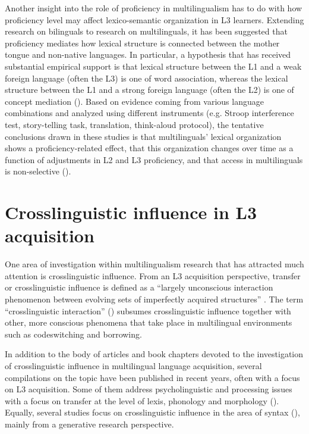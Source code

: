 \documentclass[output=paper]{../langscibook}
\begin{document}
Another insight into the role of proficiency in multilingualism has to do with how proficiency level may affect lexico-semantic organization in L3 learners. Extending research on bilinguals to research on multilinguals, it has been suggested that proficiency mediates how lexical structure is connected between the mother tongue and non-native languages. In particular, a hypothesis that has received substantial empirical support is that lexical structure between the L1 and a weak foreign language (often the L3) is one of word association, whereas the lexical structure between the L1 and a strong foreign language (often the L2) is one of concept mediation (\citealt{Abunuwara1992, Schönpflug2000, Herwig2001, CenozEtAl2003}). Based on evidence coming from various language combinations and analyzed using different instruments (e.g. Stroop interference test, story-telling task, translation, think-aloud protocol), the tentative conclusions drawn in these studies is that multilinguals’ lexical organization shows a proficiency-related effect, that this organization changes over time as a function of adjustments in L2 and L3 proficiency, and that access in multilinguals is non-selective (\citealt{DijkstraVanHell2003}).

\section{Crosslinguistic influence in L3 acquisition}\label{sec:sanchez1:4}

One area of investigation within multilingualism research that has attracted much attention is crosslinguistic influence. From an L3 acquisition perspective, transfer or crosslinguistic influence is defined as a “largely unconscious interaction phenomenon between evolving sets of imperfectly acquired structures” \citep[143]{Bouvy2000}. The term ``crosslinguistic interaction'' (\citealt{HerdinaJessner2002, Jessner2003}) subsumes crosslinguistic influence together with other, more conscious phenomena that take place in multilingual environments such as codeswitching and borrowing.

  In addition to the body of articles and book chapters devoted to the investigation of crosslinguistic influence in multilingual language acquisition, several compilations on the topic have been published in recent years, often with a focus on L3 acquisition. Some of them address psycholinguistic and processing issues with a focus on transfer at the level of lexis, phonology and morphology (\citealt{DeAngelisEtAl2015, Peukert2015}). Equally, several studies focus on crosslinguistic influence in the area of syntax (\citealt{Leung2009, CabrelliEtAl2012, AngelovskaHahn2017}), mainly from a generative research perspective.
\end{document}
